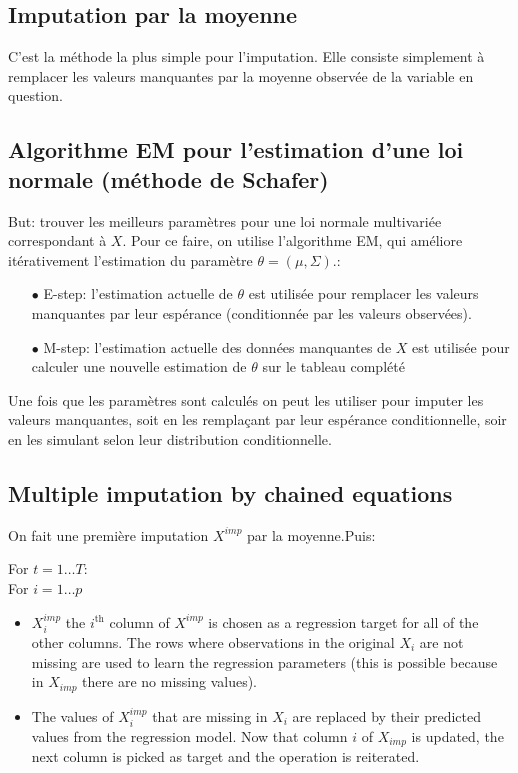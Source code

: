 \documentclass[12pt, a4paper]{article}
\begin{document}
\subsection{Imputation par la moyenne}
C'est la méthode la plus simple pour l'imputation. Elle consiste simplement à remplacer les valeurs manquantes par la moyenne observée de la variable en question.

\subsection{Algorithme EM pour l'estimation d'une loi normale (méthode de Schafer)}
\label{schafer}
But: trouver les meilleurs paramètres pour une loi normale multivariée correspondant à $X$. Pour ce faire, on utilise l'algorithme EM, qui améliore itérativement l'estimation du paramètre $\theta = (\mu, \Sigma)$.:
\begin{itemize}
\item[$\bullet$]E-step: l'estimation actuelle de $\theta$ est utilisée pour remplacer les valeurs manquantes par leur espérance (conditionnée par les valeurs observées). 
\item[$\bullet$]M-step: l'estimation actuelle des données manquantes de $X$ est utilisée pour calculer une nouvelle estimation de $\theta$ sur le tableau complété
\end{itemize}

Une fois que les paramètres sont calculés on peut les utiliser pour imputer les valeurs manquantes, soit en les remplaçant par leur espérance conditionnelle, soir en les simulant selon leur distribution conditionnelle.

\subsection{Multiple imputation by chained equations}
\label{mice}
On fait une première imputation $X^{imp}$ par la moyenne.Puis:

For $t=1\ldots T$: \\
\hspace*{1cm} For $i=1\ldots p$
\begin{itemize}
\item $X^{imp}_i$ the $i^{\text{th}}$ column of $X^{imp}$ is chosen as a regression target for all of the other columns. The rows where observations in the original $X_i$ are not missing are used to learn the regression parameters (this is possible because in $X_{imp}$ there are no missing values). 
\item The values of $X^{imp}_i$ that are missing in $X_i$ are replaced by their predicted values from the regression model. Now that column $i$ of $X_{imp}$ is updated, the next column is picked as target and the operation is reiterated.
\end{itemize}
\end{document}

